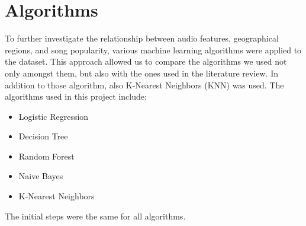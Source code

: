 \chapter{Algorithms}

To further investigate the relationship between audio features, geographical regions, and song popularity, various machine learning algorithms were applied to the dataset. This approach allowed us to compare the algorithms we used not only amongst them, but also with the ones used in the literature review. In addition to those algorithm, also K-Nearest Neighbors (KNN) was used.
The algorithms used in this project include:

\begin{itemize}
    \item Logistic Regression
    \item Decision Tree
    \item Random Forest
    \item Naive Bayes
    \item K-Nearest Neighbors
\end{itemize}

The initial steps were the same for all algorithms.

